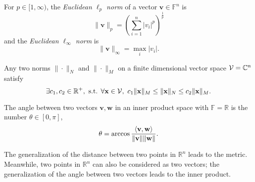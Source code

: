 \begin{defn}
  \label{def:EuclideanLpNorm}
  For $p\in [1,\infty)$, the \emph{Euclidean $\ell_p$ norm}
  of a vector $\mathbf{v}\in\mathbb{F}^n$ is
  \begin{equation}
    \label{eq:EuclideanLpNorm}
    \|\mathbf{v}\|_p= \left(\sum_{i=1}^n |v_i|^p\right)^{\frac{1}{p}}
  \end{equation}
  and the \emph{Euclidean $\ell_{\infty}$ norm} is 
  \begin{equation}
    \label{eq:EuclideanLinfNorm}
    \|\mathbf{v}\|_{\infty}= \max_{i} |v_i|.
  \end{equation}
\end{defn}

\begin{thm}
  \label{thm:normEquivalence}
  Any two norms $\|\cdot\|_N$ and $\|\cdot\|_M$
  on a finite dimensional vector space
  ${\cal V}=\mathbb{C}^n$ satisfy
  \begin{equation}
    \label{eq:normEquivalence}
    \exists c_1,c_2\in \mathbb{R}^+,
    \textrm{ s.t. } \forall\mathbf{x}\in {\cal V}, \ 
    c_1\|\mathbf{x}\|_M \le \|\mathbf{x}\|_N \le c_2\|\mathbf{x}\|_M.
  \end{equation}
\end{thm}

\begin{defn}
  \label{def:angle}
  The angle between two vectors $\mathbf{v},\mathbf{w}$
  in an inner product space with $\mathbb{F}=\mathbb{R}$
  is the number $\theta\in [0,\pi]$, 
  \begin{equation}
    \label{eq:angleOf2Vectors}
    \theta = \arccos \frac{\left\langle \mathbf{v}, \mathbf{w} \right\rangle}
    {\|\mathbf{v}\|\|\mathbf{w}\|}.
  \end{equation}
\end{defn}

\begin{rem}
  The generalization of the distance
  between two points in $\mathbb{R}^n$ leads to the metric.
  Meanwhile, two points in $\mathbb{R}^n$
  can also be considered as two vectors; 
  the generalization of the angle between two vectors
  leads to the inner product.
\end{rem}


